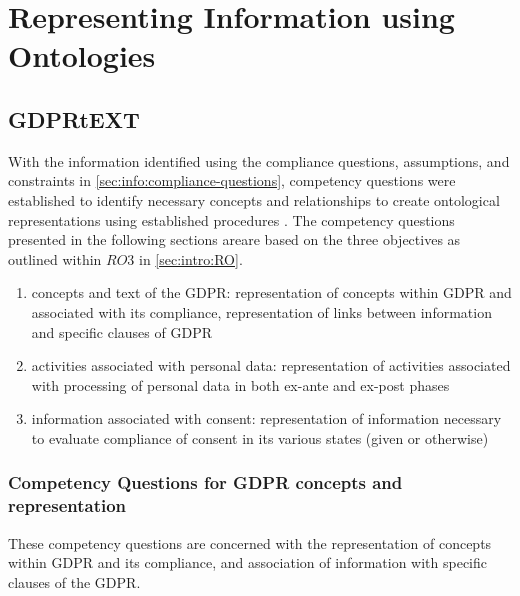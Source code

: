 \chapter{Representing Information using Ontologies}
\label{chapter:vocabularies}

\section{GDPRtEXT}\label{sec:voc:GDPRtEXT}

With the information identified using the compliance questions, assumptions, and constraints in \autoref{sec:info:compliance-questions}, competency questions were established to identify necessary concepts and relationships to create ontological representations using established procedures \cite{noy,neon}.
The competency questions presented in the following sections areare based on the three objectives as outlined within $RO3$ in \autoref{sec:intro:RO}.  
\begin{enumerate}
    \item concepts and text of the GDPR: representation of concepts within GDPR and associated with its compliance, representation of links between information and specific clauses of GDPR
    \item activities associated with personal data: representation of activities associated with processing of personal data in both ex-ante and ex-post phases
    \item information associated with consent: representation of information necessary to evaluate compliance of consent in its various states (given or otherwise)
\end{enumerate}

\subsection{Competency Questions for GDPR concepts and representation}
These competency questions are concerned with the representation of concepts within GDPR and its compliance, and association of information with specific clauses of the GDPR.

